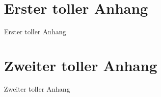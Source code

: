\begin{appendices}

\chapter{Erster toller Anhang}

Erster toller Anhang

\chapter{Zweiter toller Anhang}

Zweiter toller Anhang

\end{appendices}
